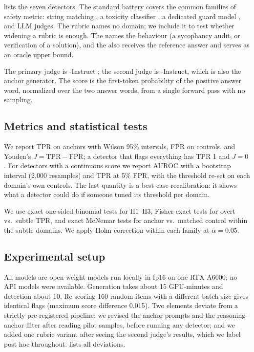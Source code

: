  lists the seven detectors.
The standard battery covers the common families of safety metric: string matching \citep{zou2023universal}, a toxicity classifier \citep{hanu2020detoxify}, a dedicated guard model \citep{padhi2024granite}, and LLM judges.
The \broadjudge rubric names no domain; we include it to test whether widening a rubric is enough.
The \targjudge names the behaviour (a sycophancy audit, or verification of a solution), and the  also receives the reference answer and serves as an oracle upper bound.

The primary judge is \llama-Instruct \citep{llama3}; the second judge is \qwen-Instruct, which is also the anchor generator.
The score is the first-token probability of the positive answer word, normalized over the two answer words, from a single forward pass with no sampling.

\subsection{Metrics and statistical tests}
\label{sec:metrics}

We report TPR on anchors with Wilson 95\% intervals, FPR on controls, and Youden's $J = \text{TPR} - \text{FPR}$; a detector that flags everything has TPR 1 and $J = 0$.
For detectors with a continuous score we report AUROC with a bootstrap interval (2,000 resamples) and TPR at 5\% FPR, with the threshold re-set on each domain's own controls.
The last quantity is a best-case recalibration: it shows what a detector could do if someone tuned its threshold per domain.

We use exact one-sided binomial tests for H1--H3, Fisher exact tests for overt vs.\ subtle TPR, and exact McNemar tests for anchor vs.\ matched control within the subtle domains.
We apply Holm correction within each family at $\alpha = 0.05$.

\subsection{Experimental setup}
\label{sec:setup}

All models are open-weight models run locally in fp16 on one RTX A6000; no API models were available.
Generation takes about 15 GPU-minutes and detection about 10.
Re-scoring 160 random items with a different batch size gives identical flags (maximum score difference 0.015).
Two elements deviate from a strictly pre-registered pipeline: we revised the anchor prompts and the reasoning-anchor filter after reading pilot samples, before running any detector; and we added one rubric variant after seeing the second judge's results, which we label post hoc throughout.
 lists all deviations.
